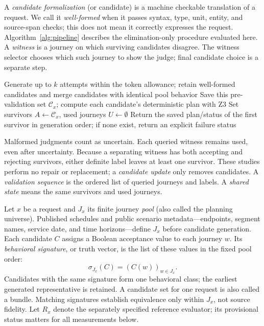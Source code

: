 \documentclass[a4paper,twoside]{article}
\begin{document}
\noindent A \emph{candidate formalization} (or candidate) is a machine checkable translation of a request. We call it \emph{well-formed} when it passes syntax, type, unit, entity, and source-span checks; this does not mean it correctly expresses the request. Algorithm~\ref{alg:pipeline} describes the elimination-only procedure evaluated here. A \emph{witness} is a journey on which surviving candidates disagree. The witness selector chooses which such journey to show the judge; final candidate choice is a separate step.

\begin{algorithm}[ht]
\caption{Candidate generation, validation, and final choice}
\label{alg:pipeline}
Generate up to $k$ attempts within the token allowance; retain well-formed candidates and merge candidates with identical pool behavior\;
Save this pre-validation set $\mathcal C_x$; compute each candidate's deterministic plan with Z3\;
Set survivors $A\leftarrow\mathcal C_x$, used journeys $U\leftarrow\emptyset$\;
Return the saved plan/status of the first survivor in generation order; if none exist, return an explicit failure status\;
\end{algorithm}

Malformed judgments count as uncertain. Each queried witness remains used, even after uncertainty. Because a separating witness has both accepting and rejecting survivors, either definite label leaves at least one survivor. These studies perform no repair or replacement; a \emph{candidate update} only removes candidates. A \emph{validation sequence} is the ordered list of queried journeys and labels. A \emph{shared state} means the same survivors and used journeys.

Let $x$ be a request and $J_x$ its finite journey \emph{pool} (also called the planning universe). Published schedules and public scenario metadata---endpoints, segment names, service date, and time horizons---define $J_x$ before candidate generation. Each candidate $C$ assigns a Boolean acceptance value to each journey $w$. Its \emph{behavioral signature}, or truth vector, is the list of these values in the fixed pool order:
\begin{equation}
  \sigma_{J_x}(C)=(C(w))_{w\in J_x}.
\end{equation}
Candidates with the same signature form one behavioral class; the earliest generated representative is retained. A candidate set for one request is also called a bundle. Matching signatures establish equivalence only within $J_x$, not source fidelity. Let $R_x$ denote the separately specified reference evaluator; its provisional status matters for all measurements below.
\end{document}
